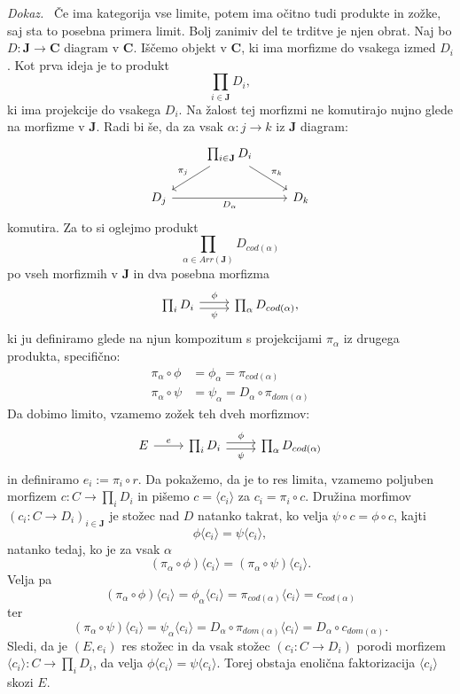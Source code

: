 \documentclass[12pt,a4paper]{book}
\theoremstyle{definition}
\theoremstyle{plain}
\newenvironment{dokaz}{\emph{Dokaz.}\ }{\hspace{\fill}{$\Box$}}
\theoremstyle{definition}
\theoremstyle{remark}
\newcommand{\cat}[1]{\textbf{#1}}
\begin{document}
\begin{dokaz}
Če ima kategorija vse limite, potem ima očitno tudi produkte in zožke, saj sta to posebna primera limit. Bolj zanimiv del te trditve je njen obrat.
Naj bo $D : \cat{J} \to \cat{C}$ diagram v $\cat{C}$. Iščemo objekt v $\cat{C}$, ki ima morfizme do vsakega izmed $D_i$. Kot prva ideja je to produkt 
$$\prod_{i \in \cat{J}}D_i,$$
ki ima projekcije do vsakega $D_i$. Na žalost tej morfizmi ne komutirajo nujno glede na morfizme v $\cat{J}$. Radi bi še, da za vsak $\alpha : j \to k$ iz  $\cat{J}$ diagram:
%
$$ \begin{tikzcd}
& \prod_{i \in \cat{J}}D_i \ar[dl, "\pi_j"'] \ar[dr, "\pi_k"] & \\
D_j \ar[rr, "D_\alpha"'] && D_k
\end{tikzcd} $$
komutira. Za to si oglejmo produkt
$$ \prod_{\alpha \in Arr(\cat{J})} D_{cod(\alpha)} $$
po vseh morfizmih v $\cat{J}$ in dva posebna morfizma
$$ \begin{tikzcd}[sep=normal]
\prod_{i }D_i \ar[r, shift left, "\phi"] \ar[r, shift right, "\psi"'] & \prod_{\alpha } D_{cod(\alpha)},
\end{tikzcd} $$
ki ju definiramo glede na njun kompozitum s projekcijami $\pi_\alpha$ iz drugega produkta, specifično:
\begin{align*}
\pi_\alpha \circ \phi &= \phi_\alpha = \pi_{cod(\alpha)} \\
\pi_\alpha \circ \psi &= \psi_\alpha = D_\alpha \circ \pi_{dom(\alpha)}
\end{align*}
Da dobimo limito, vzamemo zožek teh dveh morfizmov:
$$ \begin{tikzcd}[sep=normal]
E \ar[r, "e"] & \prod_{i }D_i \ar[r, shift left, "\phi"] \ar[r, shift right, "\psi"'] & \prod_{\alpha } D_{cod(\alpha)}
\end{tikzcd} $$
in definiramo $e_i := \pi_i \circ r$. Da pokažemo, da je to res limita, vzamemo poljuben morfizem $c : C \to \prod_i D_i$ in pišemo $c = \langle c_i \rangle$ za $c_i = \pi_i \circ c$. Družina morfimov $(c_i : C \to D_i)_{i \in \cat{J}}$ je stožec nad $D$ natanko takrat, ko velja $\psi \circ c = \phi \circ c$, kajti
$$\phi \langle c_i \rangle = \psi \langle c_i \rangle,$$
natanko tedaj, ko je za vsak $\alpha$
$$(\pi_\alpha \circ \phi) \langle c_i \rangle = (\pi_\alpha \circ \psi) \langle c_i \rangle.$$
Velja pa
$$(\pi_\alpha \circ \phi) \langle c_i \rangle = \phi_\alpha \langle c_i \rangle = \pi_{cod(\alpha)}\langle c_i \rangle = c_{cod(\alpha)} $$
ter
$$(\pi_\alpha \circ \psi) \langle c_i \rangle = \psi_\alpha \langle c_i \rangle  = D_\alpha \circ \pi_{dom(\alpha)} \langle c_i \rangle = D_\alpha \circ c_{dom(\alpha)}.$$
Sledi, da je $(E, e_i)$ res stožec in da vsak stožec $(c_i : C \to D_i)$ porodi morfizem $\langle c_i \rangle : C \to \prod_i D_i$, da velja $\phi\langle c_i \rangle = \psi \langle c_i \rangle$. Torej obstaja enolična faktorizacija $\langle c_i \rangle$ skozi $E$.

\end{dokaz}
\end{document}

